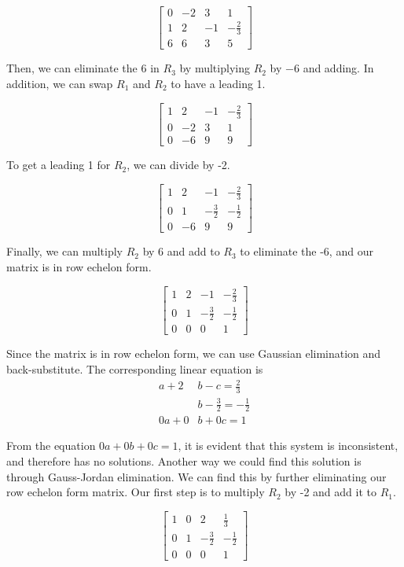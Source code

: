 \documentclass[11pt, letterpaper, twoside]{article}
\begin{document}
\begin{enumerate}
$$\begin{bmatrix}
0 & -2 & 3 & 1\\
1 & 2 & -1 & -\frac {2}{3}\\
6 & 6 & 3 & 5
\end{bmatrix}$$

Then, we can eliminate the 6 in $R_3$ by multiplying $R_2$ by $-6$ and adding. In addition, we can swap $R_1$ and $R_2$ to have a leading 1.

$$\begin{bmatrix}
1 & 2 & -1 &-\frac {2}{3}\\
0 & -2 & 3 & 1\\
0 & -6 & 9 & 9
\end{bmatrix}$$

To get a leading 1 for $R_2$, we can divide by -2.

$$\begin{bmatrix}
1 & 2 & -1 &-\frac {2}{3}\\
0 & 1 & -\frac {3}{2} & -\frac {1}{2}\\
0 & -6 & 9 & 9
\end{bmatrix}$$

Finally, we can multiply $R_2$ by 6 and add to $R_3$ to eliminate the -6, and our matrix is in row echelon form.

$$\begin{bmatrix}
1 & 2 & -1 &-\frac {2}{3}\\
0 & 1 & -\frac {3}{2} & -\frac {1}{2}\\
0 & 0 & 0 & 1
\end{bmatrix}$$

Since the matrix is in row echelon form, we can use Gaussian elimination and back-substitute. The corresponding linear equation is
\begin{align*}
a+2&b-c=\frac{2}{3}\\
&b-\frac{3}{2}=-\frac{1}{2}\\
0a+0&b+0c=1
\end{align*}

From the equation $0a+0b+0c=1$, it is evident that this system is inconsistent, and therefore has no solutions. Another way we could find this solution is through Gauss-Jordan elimination. We can find this by further eliminating our row echelon form matrix. Our first step is to multiply $R_2$ by -2 and add it to $R_1$.

$$\begin{bmatrix}
1 & 0 & 2 &\frac {1}{3}\\
0 & 1 & -\frac {3}{2} & -\frac {1}{2}\\
0 & 0 & 0 & 1
\end{bmatrix}$$


\end{enumerate}
\end{document}
